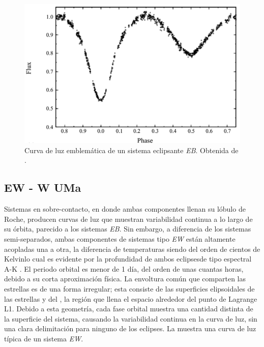 \begin{figure}[!ht]
	\centering
	\includegraphics[scale=0.63]{Introduccion/Figures/Figura EB Curva_Modelling of WUMa Stars.png}
	\caption{Curva de luz emblemática de un sistema eclipsante
	\textit{EB}. Obtenida de
	.}
	\label{figuraEBCurvaLuz}
\end{figure}

\subsection{EW - W UMa}

Sistemas en sobre-contacto, en donde ambas componentes llenan su lóbulo de
Roche, producen curvas de luz que muestran variabilidad continua a lo largo de
su órbita, parecido a los sistemas \textit{EB}. Sin embargo, a diferencia de los
sistemas semi-separados, ambas componentes de sistemas tipo \textit{EW} están
altamente acopladas una a otra, la diferencia de temperaturas siendo del orden
de cientos de Kelvin\textemdash lo cual es evidente por la profundidad de ambos
eclipses\textemdash de tipo espectral A-K
. El periodo orbital es
menor de 1 día, del orden de unas cuantas horas, debido a su corta aproximación
física. La envoltura común que comparten las estrellas es de una forma
irregular; esta consiste de las superficies elipsoidales de las estrellas y del
, la región que llena el espacio alrededor del punto de Lagrange
L1. Debido a esta geometría, cada fase orbital muestra una cantidad distinta de
la superficie del sistema, causando la variabilidad continua en la curva de luz,
sin una clara delimitación para ninguno de los eclipses. La
 muestra una curva de luz típica de un sistema
\textit{EW}. 

